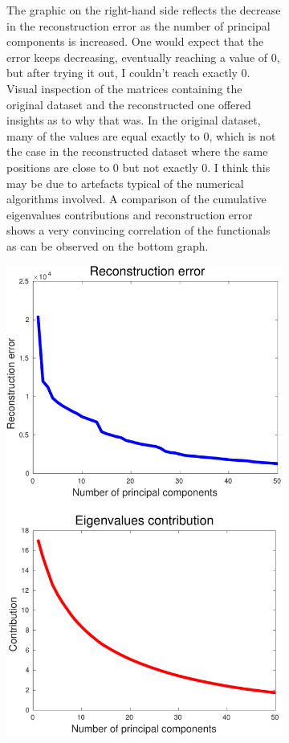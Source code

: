 \documentclass[11pt, a4paper]{article}
\begin{document}
\begin{figure}[H]
    \centering
    \begin{subfigure}[b]{.6\textwidth}
      The graphic on the right-hand side reflects the decrease in the
      reconstruction error as the number of principal components is
      increased. One would expect that the error keeps decreasing,
      eventually reaching a value of 0, but after trying it out, I
      couldn't reach exactly 0. Visual inspection of the matrices
      containing the original dataset and the reconstructed one
      offered insights as to why that was. In the original dataset,
      many of the values are equal exactly to 0, which is not the case
      in the reconstructed dataset where the same positions are close
      to 0 but not exactly 0. I think this may be due to artefacts
      typical of the numerical algorithms involved. A comparison of
      the cumulative eigenvalues contributions and reconstruction
      error shows a very convincing correlation of the functionals as
      can be observed on the bottom graph.
    \end{subfigure}%
    \begin{subfigure}{.4\textwidth}
      \vspace{-120pt}
      \centering
      \includegraphics[width=0.75\linewidth]{unsupervised_reconstruction_error.pdf}
    \end{subfigure}
\end{figure}
\end{document}
